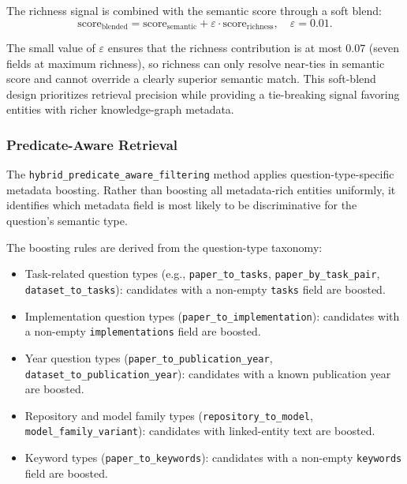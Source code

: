 The richness signal is combined with the semantic score through a soft blend:
\[
  \text{score}_{\text{blended}} = \text{score}_{\text{semantic}}
    + \varepsilon \cdot \text{score}_{\text{richness}},
  \quad \varepsilon = 0.01.
\]

The small value of $\varepsilon$ ensures that the richness contribution is at
most $0.07$ (seven fields at maximum richness), so richness can only resolve
near-ties in semantic score and cannot override a clearly superior semantic
match.
This soft-blend design prioritizes retrieval precision while providing a
tie-breaking signal favoring entities with richer knowledge-graph metadata.

\subsubsection{Predicate-Aware Retrieval}
\label{subsubsec:predicate_aware}

The \texttt{hybrid\_predicate\_aware\_filtering} method applies
question-type-specific metadata boosting.
Rather than boosting all metadata-rich entities uniformly, it identifies
which metadata field is most likely to be discriminative for the question's
semantic type.

The boosting rules are derived from the question-type taxonomy:
\begin{itemize}
  \item Task-related question types (e.g., \texttt{paper\_to\_tasks},
        \texttt{paper\_by\_task\_pair}, \texttt{dataset\_to\_tasks}):
        candidates with a non-empty \texttt{tasks} field are boosted.
  \item Implementation question types (\texttt{paper\_to\_implementation}):
        candidates with a non-empty \texttt{implementations} field are boosted.
  \item Year question types (\texttt{paper\_to\_publication\_year},
        \texttt{dataset\_to\_publication\_year}): candidates with a known
        publication year are boosted.
  \item Repository and model family types (\texttt{repository\_to\_model},
        \texttt{model\_family\_variant}): candidates with linked-entity text
        are boosted.
  \item Keyword types (\texttt{paper\_to\_keywords}): candidates with a
        non-empty \texttt{keywords} field are boosted.
\end{itemize}

